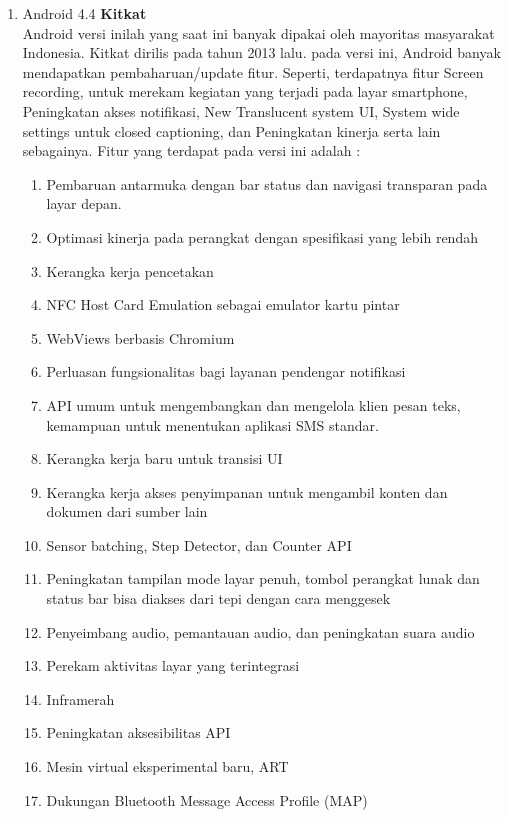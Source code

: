 \begin{enumerate}
\item Android 4.4 \textbf{Kitkat}\\
Android versi inilah yang saat ini banyak dipakai oleh mayoritas masyarakat Indonesia. Kitkat dirilis pada tahun 2013 lalu. pada versi ini, Android banyak mendapatkan pembaharuan/update fitur. Seperti, terdapatnya fitur Screen recording, untuk merekam kegiatan yang terjadi pada layar smartphone, Peningkatan akses notifikasi, New Translucent system UI, System wide settings untuk closed captioning, dan Peningkatan kinerja serta lain sebagainya. Fitur yang terdapat pada versi ini adalah : 
\begin{enumerate}
    \item Pembaruan antarmuka dengan bar status dan navigasi transparan pada layar depan.
    \item Optimasi kinerja pada perangkat dengan spesifikasi yang lebih rendah
    \item Kerangka kerja pencetakan
    \item NFC Host Card Emulation sebagai emulator kartu pintar
    \item WebViews berbasis Chromium
    \item Perluasan fungsionalitas bagi layanan pendengar notifikasi
    \item API umum untuk mengembangkan dan mengelola klien pesan teks, kemampuan untuk menentukan aplikasi SMS standar.
    \item Kerangka kerja baru untuk transisi UI
    \item Kerangka kerja akses penyimpanan untuk mengambil konten dan dokumen dari sumber lain
    \item Sensor batching, Step Detector, dan Counter API
    \item Peningkatan tampilan mode layar penuh, tombol perangkat lunak dan status bar bisa diakses dari tepi dengan cara menggesek
    \item Penyeimbang audio, pemantauan audio, dan peningkatan suara audio
    \item Perekam aktivitas layar yang terintegrasi
    \item Inframerah
    \item Peningkatan aksesibilitas API
    \item Mesin virtual eksperimental baru, ART
    \item Dukungan Bluetooth Message Access Profile (MAP)
\end{enumerate}


\end{enumerate}
